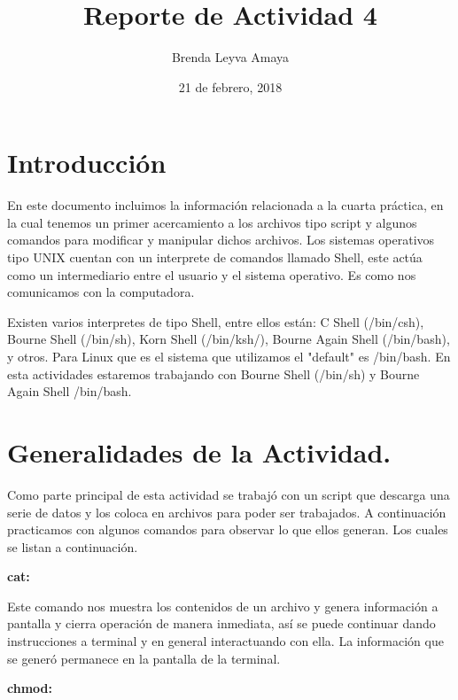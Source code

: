 \documentclass{article} %
\title{Reporte de Actividad 4}
\author{Brenda Leyva Amaya}
\date{21 de febrero, 2018}
\begin{document}
\maketitle %

\section{Introducción}

	En este documento incluimos la información relacionada a la cuarta práctica, en la cual tenemos un primer acercamiento a los archivos tipo script y algunos comandos para modificar y manipular dichos archivos. Los sistemas operativos tipo UNIX cuentan con un interprete de comandos llamado Shell, este actúa como un intermediario entre el usuario y el sistema operativo. Es como nos comunicamos con la computadora.
\vspace{0.5 cm}

Existen varios interpretes de tipo Shell, entre ellos están: C Shell (/bin/csh), Bourne Shell (/bin/sh), Korn Shell (/bin/ksh/), Bourne Again Shell (/bin/bash), y otros. Para Linux que es el sistema que utilizamos el "default" es /bin/bash. En esta actividades estaremos trabajando con Bourne Shell (/bin/sh) y Bourne Again Shell /bin/bash. 

\section{Generalidades de la Actividad.}

Como parte principal de esta actividad se trabajó con un script que descarga una serie de datos y los coloca en archivos para poder ser trabajados. A continuación practicamos con algunos comandos para observar lo que ellos generan. Los cuales se listan a continuación.

\vspace{0.5 cm}

\textbf{cat:}

\vspace{0.5 cm}

Este comando nos muestra los contenidos de un archivo y genera información a pantalla y cierra operación de manera inmediata, así se puede continuar dando instrucciones a terminal y en general interactuando con ella. La información que se generó permanece en la pantalla de la terminal. 

\vspace{0.5 cm}


\textbf{chmod:}
\end{document}
